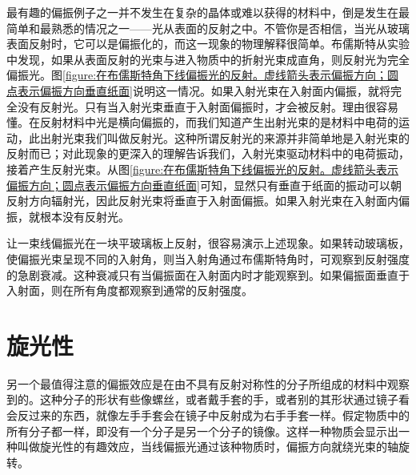 最有趣的偏振例子之一并不发生在复杂的晶体或难以获得的材料中，倒是发生在最简单和最熟悉的情况之一——光从表面的反射之中。不管你是否相信，当光从玻璃表面反射时，它可以是偏振化的，而这一现象的物理解释很简单。布儒斯特从实验中发现，如果从表面反射的光束与进入物质中的折射光束成直角，则反射光为完全偏振光。图\ref{figure:在布儒斯特角下线偏振光的反射。虚线箭头表示偏振方向；圆点表示偏振方向垂直纸面}说明这一情况。如果入射光束在入射面内偏振，就将完全没有反射光。只有当入射光束垂直于入射面偏振时，才会被反射。理由很容易懂。在反射材料中光是横向偏振的，而我们知道产生出射光束的是材料中电荷的运动，此出射光束我们叫做反射光。这种所谓反射光的来源并非简单地是入射光束的反射而已；对此现象的更深入的理解告诉我们，入射光束驱动材料中的电荷振动，接着产生反射光束。从图\ref{figure:在布儒斯特角下线偏振光的反射。虚线箭头表示偏振方向；圆点表示偏振方向垂直纸面}可知，显然只有垂直于纸面的振动可以朝反射方向辐射光，因此反射光束将垂直于入射面偏振。如果入射光束在入射面内偏振，就根本没有反射光。

让一束线偏振光在一块平玻璃板上反射，很容易演示上述现象。如果转动玻璃板，使偏振光束呈现不同的入射角，则当入射角通过布儒斯特角时，可观察到反射强度的急剧衰减。这种衰减只有当偏振面在入射面内时才能观察到。如果偏振面垂直于入射面，则在所有角度都观察到通常的反射强度。

\section{旋光性}

另一个最值得注意的偏振效应是在由不具有反射对称性的分子所组成的材料中观察到的。这种分子的形状有些像螺丝，或者戴手套的手，或者别的其形状通过镜子看会反过来的东西，就像左手手套会在镜子中反射成为右手手套一样。假定物质中的所有分子都一样，即没有一个分子是另一个分子的镜像。这样一种物质会显示出一种叫做旋光性的有趣效应，当线偏振光通过该种物质时，偏振方向就绕光束的轴旋转。


